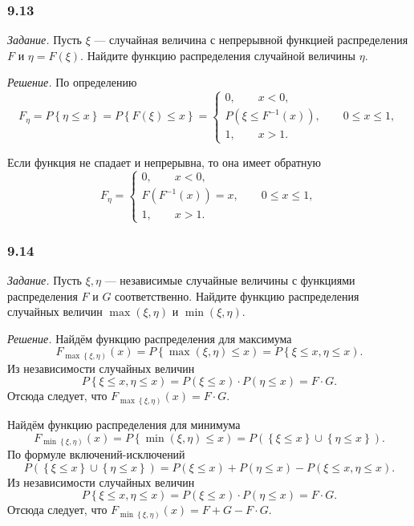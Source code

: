 \subsubsection*{9.13}

\textit{Задание.} Пусть $ \xi $ --- случайная величина с непрерывной функцией распределения $F$ и $ \eta = F \left( \xi \right) $.
Найдите функцию распределения случайной величины $ \eta $.

\textit{Решение.} По определению
$$F_{ \eta } =
P \left\{ \eta \leq x \right\} =
P \left\{ F \left( \xi \right) \leq x \right\} =
\begin{cases}
0, \qquad x < 0, \\
P \left( \xi \leq F^{-1} \left( x \right) \right), \qquad 0 \leq x \leq 1, \\
1, \qquad x > 1.
\end{cases}$$

Если функция не спадает и непрерывна, то она имеет обратную
$$F_{ \eta } =
\begin{cases}
0, \qquad x < 0, \\
F \left( F^{-1} \left( x \right) \right) = x, \qquad 0 \leq x \leq 1, \\
1, \qquad x > 1.
\end{cases}$$

\subsubsection*{9.14}

\textit{Задание.} Пусть $ \xi, \eta $ --- независимые случайные величины с функциями распределения $F$ и $G$ соответственно.
Найдите функцию распределения случайных величин $ \max \left( \xi, \eta \right) $ и $ \min \left( \xi, \eta \right) $.

\textit{Решение.}
Найдём функцию распределения для максимума
$$F_{ \max \left\{ \xi, \eta \right) } \left( x \right) =
P \left\{ \max \left( \xi, \eta \right) \leq x \right) =
P \left\{ \xi \leq x, \eta \leq x \right).$$
Из независимости случайных величин
$$P \left\{ \xi \leq x, \eta \leq x \right) =
P \left( \xi \leq x \right) \cdot P \left( \eta \leq x \right) =
F \cdot G.$$
Отсюда следует, что $F_{ \max \left\{ \xi, \eta \right) } \left( x \right) = F \cdot G$.

Найдём функцию распределения для минимума
$$F_{ \min \left\{ \xi, \eta \right) } \left( x \right) =
P \left\{ \min \left( \xi, \eta \right) \leq x \right) =
P \left( \left\{ \xi \leq x \right\} \cup \left\{ \eta \leq x \right\} \right).$$
По формуле включений-исключений
$$P \left( \left\{ \xi \leq x \right\} \cup \left\{ \eta \leq x \right\} \right) =
P \left( \xi \leq x \right) + P \left( \eta \leq x \right) - P \left( \xi \leq x, \eta \leq x \right).$$
Из независимости случайных величин
$$P \left\{ \xi \leq x, \eta \leq x \right) =
P \left( \xi \leq x \right) \cdot P \left( \eta \leq x \right) =
F \cdot G.$$
Отсюда следует, что $F_{ \min \left\{ \xi, \eta \right) } \left( x \right) = F + G - F \cdot G$.

